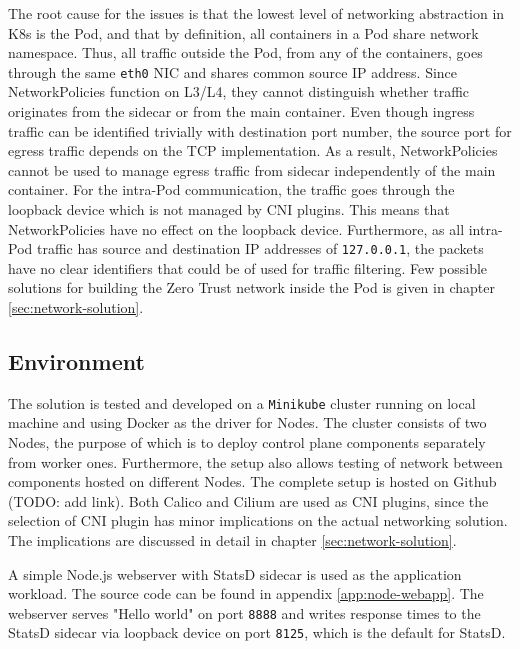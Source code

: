 \documentclass[english, 12pt, a4paper, sci, utf8, a-2b, online]{aaltothesis}
\begin{document}
The root cause for the issues is that the lowest level of networking abstraction in K8s is the Pod, and that by definition, all containers in a Pod share network namespace. Thus, all traffic outside the Pod, from any of the containers, goes through the same \texttt{eth0} NIC and shares common source IP address. Since NetworkPolicies function on L3/L4, they cannot distinguish whether traffic originates from the sidecar or from the main container. Even though ingress traffic can be identified trivially with destination port number, the source port for egress traffic depends on the TCP implementation. As a result, NetworkPolicies cannot be used to manage egress traffic from sidecar independently of the main container. For the intra-Pod communication, the traffic goes through the loopback device which is not managed by CNI plugins. This means that NetworkPolicies have no effect on the loopback device. Furthermore, as all intra-Pod traffic has source and destination IP addresses of \texttt{127.0.0.1}, the packets have no clear identifiers that could be of used for traffic filtering. Few possible solutions for building the Zero Trust network inside the Pod is given in chapter \ref{sec:network-solution}.


\subsection{Environment}

The solution is tested and developed on a \texttt{Minikube} cluster running on local machine and using Docker as the driver for Nodes. The cluster consists of two Nodes, the purpose of which is to deploy control plane components separately from worker ones. Furthermore, the setup also allows testing of network between components hosted on different Nodes. The complete setup is hosted on Github (TODO: add link). Both Calico and Cilium are used as CNI plugins, since the selection of CNI plugin has minor implications on the actual networking solution. The implications are discussed in detail in chapter \ref{sec:network-solution}.

A simple Node.js webserver with StatsD sidecar is used as the application workload. The source code can be found in appendix \ref{app:node-webapp}. The webserver serves "Hello world" on port \texttt{8888} and writes response times to the StatsD sidecar via loopback device on port \texttt{8125}, which is the default for StatsD.
\end{document}

